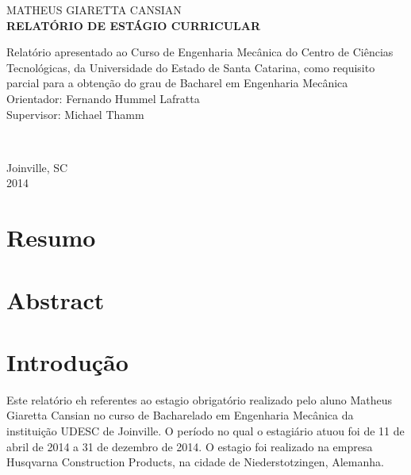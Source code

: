 \documentclass[12pt]{article}
\begin{document}
	\begin{titlepage}
		\begin{center}
			{\fontsize{16pt}{\baselineskip}\fontfamily{\familydefault}\selectfont MATHEUS GIARETTA CANSIAN}\\[6cm]
			{\fontsize{18pt}{\baselineskip}\fontfamily{\familydefault}\selectfont \bf RELATÓRIO DE ESTÁGIO CURRICULAR}\\[5.5cm]
		\end{center}
		
		{
			\fontsize{14pt}{\baselineskip} \fontfamily{\familydefault} \selectfont
			
			\hspace{.45\textwidth} \begin{minipage}{.5\textwidth}
				\noindent 
				Relatório apresentado ao Curso de Engenharia Mecânica do Centro de Ciências Tecnológicas, 
				da Universidade do Estado de Santa Catarina, 
				como requisito parcial para a obtenção do grau de Bacharel em Engenharia Mecânica\\[0.6cm]
				Orientador: Fernando Hummel Lafratta\\[0.1cm]
				Supervisor: Michael Thamm
			\end{minipage}
		}\\[2.5cm]
		
		
		\begin{center}
		{
			\fontsize{14pt}{\baselineskip} \fontfamily{\familydefault} \selectfont
			Joinville, SC\\[0.2cm]
			2014
		}
		\end{center}
	\end{titlepage}

\onehalfspacing

\tableofcontents
\pagebreak

\listoffigures
\pagebreak

\section{Resumo}
\pagebreak

\section{Abstract}
\pagebreak


\section{Introdução}
	Este relatório eh referentes ao estagio obrigatório realizado pelo aluno Matheus Giaretta Cansian no curso de Bacharelado em Engenharia Mecânica da instituição UDESC de Joinville.
	O período no qual o estagiário atuou foi de 11 de abril de 2014 a 31 de dezembro de 2014. O estagio foi realizado na empresa Husqvarna Construction Products, na cidade de Niederstotzingen, Alemanha.
\pagebreak
\end{document}
